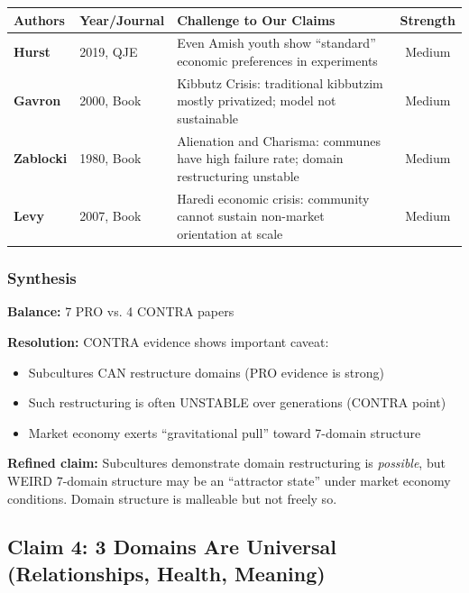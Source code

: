 \begin{center}
\scriptsize
\begin{longtable}{@{}p{3cm}p{2cm}p{6cm}c@{}}
\toprule
\textbf{Authors} & \textbf{Year/Journal} & \textbf{Challenge to Our Claims} & \textbf{Strength} \\
\midrule
\endfirsthead
\bottomrule
\endlastfoot
\textbf{Hurst} & 2019, QJE & Even Amish youth show ``standard'' economic preferences in experiments & Medium \\
\textbf{Gavron} & 2000, Book & Kibbutz Crisis: traditional kibbutzim mostly privatized; model not sustainable & Medium \\
\textbf{Zablocki} & 1980, Book & Alienation and Charisma: communes have high failure rate; domain restructuring unstable & Medium \\
\textbf{Levy} & 2007, Book & Haredi economic crisis: community cannot sustain non-market orientation at scale & Medium \\
\end{longtable}
\end{center}

\subsubsection{Synthesis}

\begin{tcolorbox}[colback=yellow!5!white, colframe=yellow!75!black, title=Evidence Synthesis: Claim 3]

\textbf{Balance:} 7 PRO vs. 4 CONTRA papers

\textbf{Resolution:} CONTRA evidence shows important caveat:
\begin{itemize}[nosep]
\item Subcultures CAN restructure domains (PRO evidence is strong)
\item Such restructuring is often UNSTABLE over generations (CONTRA point)
\item Market economy exerts ``gravitational pull'' toward 7-domain structure
\end{itemize}

\textbf{Refined claim:} Subcultures demonstrate domain restructuring is \textit{possible}, but WEIRD 7-domain structure may be an ``attractor state'' under market economy conditions. Domain structure is malleable but not freely so.

\end{tcolorbox}

\subsection{Claim 4: 3 Domains Are Universal (Relationships, Health, Meaning)}

